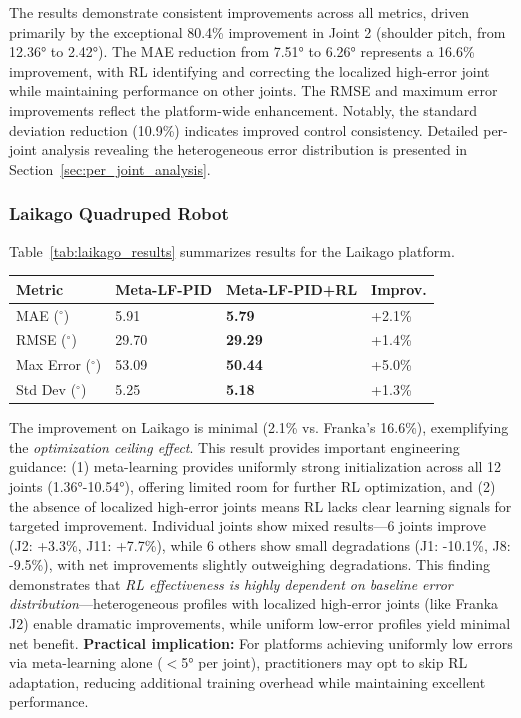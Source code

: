 \documentclass[DTMColor]{ROB-New}
\begin{document}
The results demonstrate consistent improvements across all metrics, driven primarily by the exceptional 80.4\% improvement in Joint 2 (shoulder pitch, from 12.36° to 2.42°). The MAE reduction from 7.51° to 6.26° represents a 16.6\% improvement, with RL identifying and correcting the localized high-error joint while maintaining performance on other joints. The RMSE and maximum error improvements reflect the platform-wide enhancement. Notably, the standard deviation reduction (10.9\%) indicates improved control consistency. Detailed per-joint analysis revealing the heterogeneous error distribution is presented in Section~\ref{sec:per_joint_analysis}.

\subsubsection{Laikago Quadruped Robot}

Table~\ref{tab:laikago_results} summarizes results for the Laikago platform.

\begin{table}[h]
{\begin{fntable}\centering
\begin{tabular}{@{\extracolsep{\fill}}llll}
\hline
\textbf{Metric} & \textbf{Meta-LF-PID} & \textbf{Meta-LF-PID+RL} & \textbf{Improv.} \\
\hline
MAE ($^\circ$) & 5.91 & \textbf{5.79} & +2.1\% \\
RMSE ($^\circ$) & 29.70 & \textbf{29.29} & +1.4\% \\
Max Error ($^\circ$) & 53.09 & \textbf{50.44} & +5.0\% \\
Std Dev ($^\circ$) & 5.25 & \textbf{5.18} & +1.3\% \\
\hline
\end{tabular}
\end{fntable}}
\end{table}

The improvement on Laikago is minimal (2.1\% vs. Franka's 16.6\%), exemplifying the \textit{optimization ceiling effect}. This result provides important engineering guidance: (1) meta-learning provides uniformly strong initialization across all 12 joints (1.36°-10.54°), offering limited room for further RL optimization, and (2) the absence of localized high-error joints means RL lacks clear learning signals for targeted improvement. Individual joints show mixed results—6 joints improve (J2: +3.3\%, J11: +7.7\%), while 6 others show small degradations (J1: -10.1\%, J8: -9.5\%), with net improvements slightly outweighing degradations. This finding demonstrates that \textit{RL effectiveness is highly dependent on baseline error distribution}—heterogeneous profiles with localized high-error joints (like Franka J2) enable dramatic improvements, while uniform low-error profiles yield minimal net benefit. \textbf{Practical implication:} For platforms achieving uniformly low errors via meta-learning alone ($<$5° per joint), practitioners may opt to skip RL adaptation, reducing additional training overhead while maintaining excellent performance.
\end{document}
